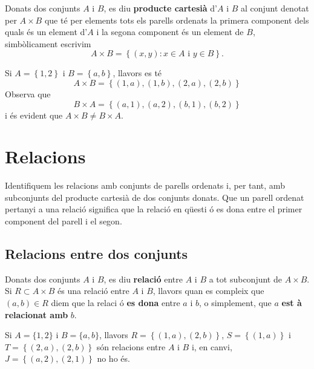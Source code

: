 \bigskip

Donats dos conjunts $A$ i $B$, es diu \textbf{producte cartesi\`{a}} d'$A$ i
$B$ al conjunt denotat per $A\times B$ que t\'{e} per elements tots els
parells ordenats la primera component dels quals \'{e}s un element d'$A$ i
la segona component \'{e}s un element de $B$, simb\`{o}licament escrivim
\begin{equation*}
A\times B=\left\{ (x,y):x\in A\text{ i }y\in B\right\} \text{.}
\end{equation*}

\begin{exem}
Si $A=\left\{ 1,2\right\} $ i $B=\left\{ a,b\right\} $, llavors es t\'{e}%
\begin{equation*}
A\times B=\left\{ (1,a),(1,b),(2,a),(2,b)\right\}
\end{equation*}
Observa que%
\begin{equation*}
B\times A=\left\{ (a,1),(a,2),(b,1),(b,2)\right\}
\end{equation*}
i \'{e}s evident que $A\times B\neq B\times A$.
\end{exem}

\section{Relacions}

Identifiquem les relacions amb conjunts de parells ordenats i, per tant, amb
subconjunts del producte cartesi\`{a} de dos conjunts donats. Que un parell
ordenat pertanyi a una relaci\'{o} significa que la relaci\'{o} en q\"{u}esti%
\'{o} es dona entre el primer component del parell i el segon.

\subsection{Relacions entre dos conjunts}

Donats dos conjunts $A$ i $B$, es diu \textbf{relaci\'{o}} entre $A$ i $B$ a
tot subconjunt de $A\times B$. Si $R\subset A\times B$ \'{e}s una relaci\'{o}
entre $A$ i $B$, llavors quan es compleix que $(a,b)\in R$ diem que la relaci%
\'{o} \textbf{es dona} entre $a$ i $b$, o simplement, que $a$ \textbf{est%
\`{a} relacionat amb} $b$.

\begin{exem}
Si $A=\{1,2\}$ i $B=\{a,b\}$, llavors $R=\left\{ (1,a),(2,b)\right\} $, $%
S=\left\{ (1,a)\right\} $ i $T=\left\{ (2,a),(2,b)\right\} $ s\'{o}n
relacions entre $A$ i $B$ i, en canvi, $J=\left\{ (a,2),(2,1)\right\} $ no
ho \'{e}s.
\end{exem}

